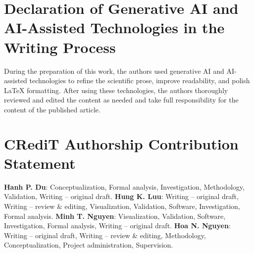 \documentclass[final,5p]{elsarticle}
\begin{document}
\section*{Declaration of Generative AI and AI-Assisted Technologies in the Writing Process}
During the preparation of this work, the authors used generative AI and AI-assisted technologies to refine the scientific prose, improve readability, and polish LaTeX formatting. After using these technologies, the authors thoroughly reviewed and edited the content as needed and take full responsibility for the content of the published article.

\section*{CRediT Authorship Contribution Statement}
\textbf{Hanh P. Du}: Conceptualization, Formal analysis, Investigation, Methodology, Validation, Writing -- original draft.
\noindent \textbf{Hung K. Luu}: Writing -- original draft, Writing -- review \& editing, Visualization, Validation, Software, Investigation, Formal analysis.
\textbf{Minh T. Nguyen}: Visualization, Validation, Software, Investigation, Formal analysis, Writing -- original draft.
\textbf{Hoa N. Nguyen}: Writing -- original draft, Writing -- review \& editing, Methodology, Conceptualization, Project administration, Supervision.




\end{document}
